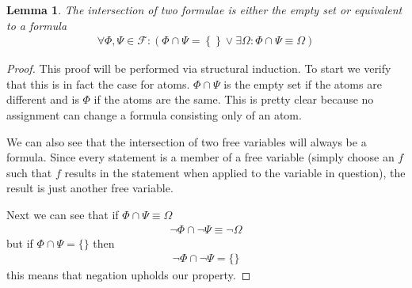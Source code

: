 \documentclass{article}
\newtheorem{lem}{Lemma}
\begin{document}
\begin{lem}
The intersection of two formulae is either the empty set or equivalent to a formula
\begin{align*}
\forall \Phi,\Psi \in \mathcal{F} : \left(\Phi \cap \Psi = \left\{\right\} \lor \exists \Omega : \Phi \cap \Psi \equiv \Omega \right)
\end{align*}
\end{lem}
\begin{proof}
This proof will be performed via structural induction.
To start we verify that this is in fact the case for atoms.
$\Phi \cap \Psi$ is the empty set if the atoms are different and is $\Phi$ if the atoms are the same.
This is pretty clear because no assignment can change a formula consisting only of an atom.

We can also see that the intersection of two free variables will always be a formula.
Since every statement is a member of a free variable (simply choose an $f$ such that $f$ results in the statement when applied to the variable in question),
the result is just another free variable.

Next we can see that if $\Phi \cap \Psi \equiv \Omega$
\begin{align*}
\neg \Phi \cap \neg \Psi \equiv \neg \Omega
\end{align*}
but if $\Phi \cap \Psi = \{\}$ then
\begin{align*}
\neg \Phi \cap \neg \Psi = \{\}
\end{align*}
this means that negation upholds our property.


\end{proof}
\end{document}
